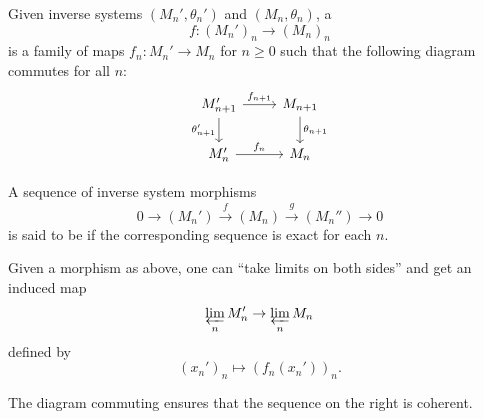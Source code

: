 \begin{defn}
	Given inverse systems $(M_{n}', \theta_{n}')$ and $(M_{n}, \theta_{n})$, a 
	\begin{equation*} 
		f : (M_{n}')_{n} \to (M_{n})_{n}
	\end{equation*} 
	is a family of maps $f_{n} : M_{n}' \to M_{n}$ for $n \ge 0$ such that the following diagram commutes for all $n$:
	\begin{equation*} 
		\begin{tikzcd}
			M_{n + 1}' \arrow[d, "\theta_{n + 1}'"'] \arrow[r, "f_{n + 1}"] & M_{n + 1} \arrow[d, "\theta_{n + 1}"] \\
			M_{n}' \arrow[r, "f_{n}"] & M_{n} 
		\end{tikzcd}
	\end{equation*}

	A sequence of inverse system morphisms
	\begin{equation*} 
		0 \to (M_{n}') \xrightarrow{f} (M_{n}) \xrightarrow{g} (M_{n}'') \to 0
	\end{equation*}
	is said to be  if the corresponding sequence is exact for each $n$.
\end{defn}
Given a morphism as above, one can ``take limits on both sides'' and get an induced map
\begin{equation*} 
	\varprojlim_{n} M_{n}' \to \varprojlim_{n} M_{n}
\end{equation*}
defined by
\begin{equation*} 
	(x_{n}')_{n} \mapsto (f_{n}(x_{n}'))_{n}.
\end{equation*}

The diagram commuting ensures that the sequence on the right is coherent.

